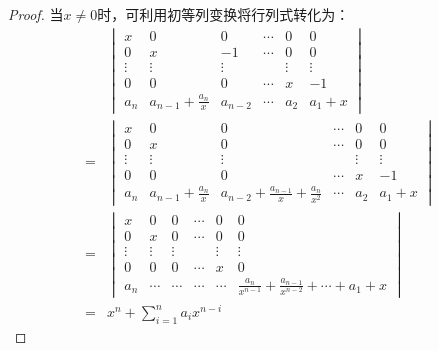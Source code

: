 \begin{proof}
    当\(x\neq0\)时，可利用初等列变换将行列式转化为：
    \begin{align*}
          &
        \begin{vmatrix}
            x      & 0                     & 0       & \cdots & 0      & 0      \\
            0      & x                     & -1      & \cdots & 0      & 0      \\
            \vdots & \vdots                & \vdots  &        & \vdots & \vdots \\
            0      & 0                     & 0       & \cdots & x      & -1     \\
            a_n    & a_{n-1}+\frac{a_n}{x} & a_{n-2} & \cdots & a_2    & a_1+x
        \end{vmatrix}                                                                                                       \\
        = &
        \begin{vmatrix}
            x      & 0                     & 0                                         & \cdots & 0      & 0      \\
            0      & x                     & 0                                         & \cdots & 0      & 0      \\
            \vdots & \vdots                & \vdots                                    &        & \vdots & \vdots \\
            0      & 0                     & 0                                         & \cdots & x      & -1     \\
            a_n    & a_{n-1}+\frac{a_n}{x} & a_{n-2}+\frac{a_{n-1}}{x}+\frac{a_n}{x^2} & \cdots & a_2    & a_1+x
        \end{vmatrix}                                               \\
        = &
        \begin{vmatrix}
            x      & 0      & 0      & \cdots & 0      & 0                                                        \\
            0      & x      & 0      & \cdots & 0      & 0                                                        \\
            \vdots & \vdots & \vdots &        & \vdots & \vdots                                                   \\
            0      & 0      & 0      & \cdots & x      & 0                                                        \\
            a_n    & \cdots & \cdots & \cdots & \cdots & \frac{a_n}{x^{n-1}}+\frac{a_{n-1}}{x^{n-2}}+\cdots+a_1+x
        \end{vmatrix} \\
        = & x^n+\sum_{i=1}^{n}a_ix^{n-i}
    \end{align*}


\end{proof}
